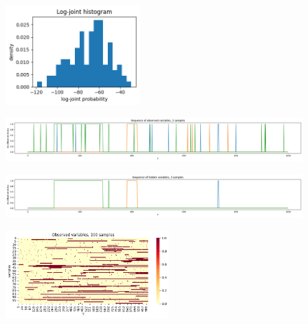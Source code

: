 \documentclass[a4 paper]{article}
\begin{document}
\begin{enumerate}
    \begin{figure}[H]
        \centering
        \includegraphics[width=0.45\textwidth]{../plots/Q2_hmm2_hist_log-joint.png}
    \end{figure}  
    \begin{figure}[H]
        \centering
        \includegraphics[width=\textwidth]{../plots/Q2_hmm2_sequence_observed.png}
    \end{figure}
    \begin{figure}[H]
        \centering
        \includegraphics[width=\textwidth]{../plots/Q2_hmm2_sequence_hidden.png}
    \end{figure}    
    \begin{figure}[H]
        \centering
        \includegraphics[width=0.55\textwidth]{../plots/Q2_hmm2_heatmap_observed.png}
    \end{figure}


\end{enumerate}
\end{document}
